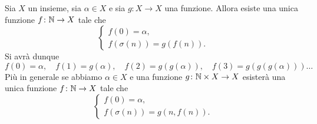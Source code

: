 \begin{theorem}
  \label{th:induzione}%
  Sia $X$ un insieme, sia $\alpha\in X$ e sia $g\colon X\to X$ una funzione.
  Allora esiste una unica funzione $f\colon {\mathbb N} \to X$ tale che
  \begin{equation}\label{eq:4835628}
    \begin{cases}
      f(0) = \alpha, \\
      f(\sigma(n)) = g(f(n)).
    \end{cases}
  \end{equation}
  Si avrà dunque
  \[
    f(0) = \alpha,\quad
    f(1) = g(\alpha),\quad
    f(2) = g(g(\alpha)),\quad
    f(3) = g(g(g(\alpha)))\dots
  \]
  Più in generale se abbiamo $\alpha\in X$ e una funzione $g\colon {\mathbb N} \times X \to X$
  esisterà una unica funzione $f\colon {\mathbb N} \to X$ tale che
  \begin{equation}
    \begin{cases}
      f(0) = \alpha, \\
      f(\sigma(n)) = g(n, f(n)).
    \end{cases}
  \end{equation}
\end{theorem}
%
